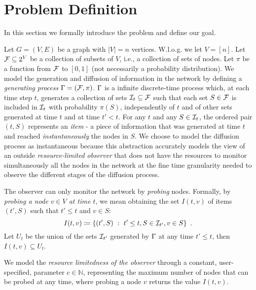 \section{Problem Definition}\label{sec:prelims}
In this section we formally introduce the problem and define our goal.

Let $G=(V,E)$ be a graph with $|V|=n$ vertices. W.l.o.g. we let $V=[n]$. Let
$\mathcal{F}\subseteq 2^V$ be a collection of subsets of $V$, i.e., a collection of
sets of nodes. Let $\pi$ be a function from $\mathcal{F}$ to $[0,1]$ (not
necessarily a probability distribution). We model the generation and diffusion
of  information in the network by defining a \emph{generating
process} $\Gamma=(\mathcal{F},\pi)$.  $\Gamma$ is a infinite discrete-time process
which, at each time step $t$, generates a collection of sets $\mathcal{I}_t\subseteq\mathcal{F}$ such
that each set $S\in\mathcal{F}$ is included in $\mathcal{I}_t$ with probability $\pi(S)$,
independently of $t$ and of other sets generated at time $t$ and at time $t'<t$.
For any $t$ and any $S\in\mathcal{I}_t$, the ordered pair $(t,S)$ represents an
\emph{item} - a piece of information that was generated at time
$t$ and reached \emph{instantaneously} the nodes in $S$.  We choose to model the
diffusion process as instantaneous because this abstraction accurately models the view of an outside
\emph{resource-limited observer} that does not have the resources to monitor simultaneously all
the nodes in the network at the fine time granularity needed to observe the
different stages of the diffusion process.

 The observer can only monitor the network by
\emph{probing} nodes. Formally, by \emph{probing a node $v\in V$ at time $t$},
we mean obtaining the set $I(t,v)$ of items $(t',S)$ such
that $t'\le t$ and $v\in S$:
\[
	I(t,v)\coloneqq\{(t',S) ~:~ t'\le t, S\in\mathcal{I}_{t'}, v\in S\}\enspace.
\]
Let $U_t$ be the union of the sets $\mathcal{I}_{t'}$ generated by $\Gamma$
at any time $t'\le t$, then $I(t,v)\subseteq U_t$. 

%
We model the \emph{resource limitedness of the observer} through a constant,
user-specified, parameter $c\in\mathbb{N}$, representing the maximum number of
nodes that can be probed at any time, where probing a node $v$ returns the value $I(t,v)$.

